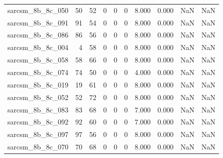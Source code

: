 \documentclass{article}
\begin{document}
\begin{longtable}{lrrrrrrrrr}
sarcsm\_8b\_8c\_050 & 50 & 52 & 0 & 0 & 0 & 8.000 & 0.000 & NaN & NaN \\
sarcsm\_8b\_8c\_091 & 91 & 54 & 0 & 0 & 0 & 8.000 & 0.000 & NaN & NaN \\
sarcsm\_8b\_8c\_086 & 86 & 56 & 0 & 0 & 0 & 8.000 & 0.000 & NaN & NaN \\
sarcsm\_8b\_8c\_004 & 4 & 58 & 0 & 0 & 0 & 8.000 & 0.000 & NaN & NaN \\
sarcsm\_8b\_8c\_058 & 58 & 66 & 0 & 0 & 0 & 8.000 & 0.000 & NaN & NaN \\
sarcsm\_8b\_8c\_074 & 74 & 50 & 0 & 0 & 0 & 4.000 & 0.000 & NaN & NaN \\
sarcsm\_8b\_8c\_019 & 19 & 61 & 0 & 0 & 0 & 8.000 & 0.000 & NaN & NaN \\
sarcsm\_8b\_8c\_052 & 52 & 72 & 0 & 0 & 0 & 8.000 & 0.000 & NaN & NaN \\
sarcsm\_8b\_8c\_083 & 83 & 68 & 0 & 0 & 0 & 7.000 & 0.000 & NaN & NaN \\
sarcsm\_8b\_8c\_092 & 92 & 60 & 0 & 0 & 0 & 7.000 & 0.000 & NaN & NaN \\
sarcsm\_8b\_8c\_097 & 97 & 56 & 0 & 0 & 0 & 8.000 & 0.000 & NaN & NaN \\
sarcsm\_8b\_8c\_070 & 70 & 68 & 0 & 0 & 0 & 8.000 & 0.000 & NaN & NaN \\
\end{longtable}
\end{document}
